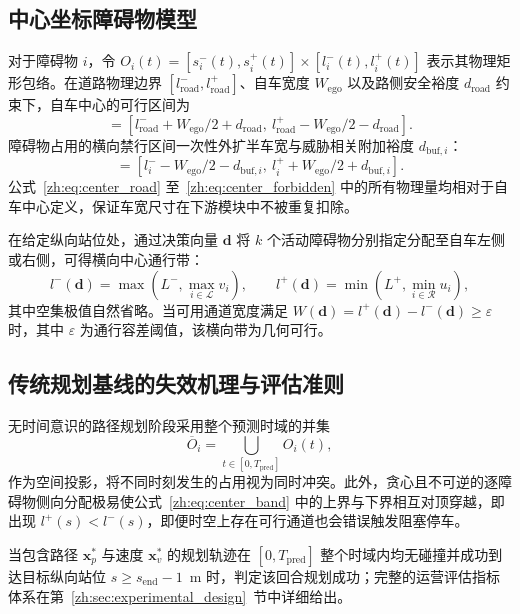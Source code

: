 \subsection{中心坐标障碍物模型}

对于障碍物 $i$，令 $O_i(t)=[s_i^-(t),s_i^+(t)]\times[l_i^-(t),l_i^+(t)]$ 表示其物理矩形包络。在道路物理边界 $[l_{\mathrm{road}}^-,l_{\mathrm{road}}^+]$、自车宽度 $W_{\mathrm{ego}}$ 以及路侧安全裕度 $d_{\mathrm{road}}$ 约束下，自车中心的可行区间为
\begin{equation}
 [L^-,L^+]=[l_{\mathrm{road}}^-+W_{\mathrm{ego}}/2+d_{\mathrm{road}},\ l_{\mathrm{road}}^+-W_{\mathrm{ego}}/2-d_{\mathrm{road}}].
 \label{zh:eq:center_road}
\end{equation}
障碍物占用的横向禁行区间一次性外扩半车宽与威胁相关附加裕度 $d_{\mathrm{buf},i}$：
\begin{equation}
 [u_i,v_i]=[l_i^- -W_{\mathrm{ego}}/2-d_{\mathrm{buf},i},\ l_i^+ +W_{\mathrm{ego}}/2+d_{\mathrm{buf},i}].
 \label{zh:eq:center_forbidden}
\end{equation}
公式~\ref{zh:eq:center_road} 至~\ref{zh:eq:center_forbidden} 中的所有物理量均相对于自车中心定义，保证车宽尺寸在下游模块中不被重复扣除。

在给定纵向站位处，通过决策向量 $\mathbf{d}$ 将 $k$ 个活动障碍物分别指定分配至自车左侧或右侧，可得横向中心通行带：
\begin{equation}
 l^-(\mathbf{d})=\max\left(L^-,\max_{i\in\mathcal{L}}v_i\right),\qquad
 l^+(\mathbf{d})=\min\left(L^+,\min_{i\in\mathcal{R}}u_i\right),
 \label{zh:eq:center_band}
\end{equation}
其中空集极值自然省略。当可用通道宽度满足 $W(\mathbf{d})=l^+(\mathbf{d})-l^-(\mathbf{d})\geq\varepsilon$ 时，其中 $\varepsilon$ 为通行容差阈值，该横向带为几何可行。

\subsection{传统规划基线的失效机理与评估准则}

无时间意识的路径规划阶段采用整个预测时域的并集
\begin{equation}
 \overline{O}_i=\bigcup_{t\in[0,T_{\mathrm{pred}}]}O_i(t),
 \label{zh:eq:prob_union}
\end{equation}
作为空间投影，将不同时刻发生的占用视为同时冲突。此外，贪心且不可逆的逐障碍物侧向分配极易使公式~\ref{zh:eq:center_band} 中的上界与下界相互对顶穿越，即出现 $l^+(s)<l^-(s)$，即便时空上存在可行通道也会错误触发阻塞停车。

当包含路径 $\mathbf{x}_p^*$ 与速度 $\mathbf{x}_v^*$ 的规划轨迹在 $[0,T_{\mathrm{pred}}]$ 整个时域内均无碰撞并成功到达目标纵向站位 $s\geq s_{\mathrm{end}}-1$~m 时，判定该回合规划成功；完整的运营评估指标体系在第~\ref{zh:sec:experimental_design}~节中详细给出。
